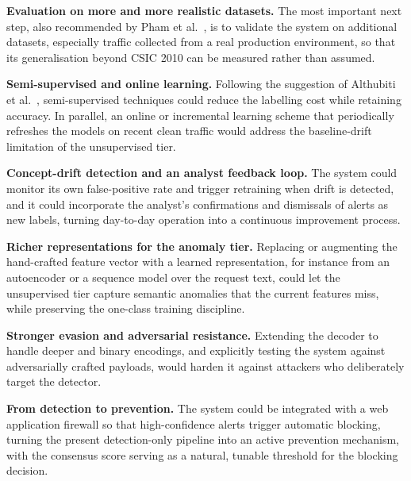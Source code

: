 \documentclass[../main.tex]{subfiles}
\begin{document}
\begin{romanlist}
  \item \textbf{Evaluation on more and more realistic datasets.} The most
        important next step, also recommended by Pham et al.~\cite{pham2016},
        is to validate the system on additional datasets, especially traffic
        collected from a real production environment, so that its
        generalisation beyond CSIC 2010 can be measured rather than assumed.

  \item \textbf{Semi-supervised and online learning.} Following the
        suggestion of Althubiti et al.~\cite{althubiti2017}, semi-supervised
        techniques could reduce the labelling cost while retaining accuracy.
        In parallel, an online or incremental learning scheme that
        periodically refreshes the models on recent clean traffic would
        address the baseline-drift limitation of the unsupervised tier.

  \item \textbf{Concept-drift detection and an analyst feedback loop.} The
        system could monitor its own false-positive rate and trigger
        retraining when drift is detected, and it could incorporate the
        analyst's confirmations and dismissals of alerts as new labels,
        turning day-to-day operation into a continuous improvement process.

  \item \textbf{Richer representations for the anomaly tier.} Replacing or
        augmenting the hand-crafted feature vector with a learned
        representation, for instance from an autoencoder or a sequence model
        over the request text, could let the unsupervised tier capture
        semantic anomalies that the current features miss, while preserving
        the one-class training discipline.

  \item \textbf{Stronger evasion and adversarial resistance.} Extending the
        decoder to handle deeper and binary encodings, and explicitly testing
        the system against adversarially crafted payloads, would harden it
        against attackers who deliberately target the detector.

  \item \textbf{From detection to prevention.} The system could be
        integrated with a web application firewall so that high-confidence
        alerts trigger automatic blocking, turning the present detection-only
        pipeline into an active prevention mechanism, with the consensus
        score serving as a natural, tunable threshold for the blocking
        decision.


\end{romanlist}
\end{document}

